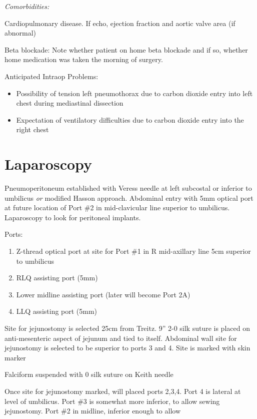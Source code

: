 \documentclass[
  letterpaper,
]{scrbook}
\providecommand{\tightlist}{%
  \setlength{\itemsep}{0pt}\setlength{\parskip}{0pt}}
\begin{document}
\emph{Comorbidities:}

Cardiopulmonary disease. If echo, ejection fraction and aortic valve
area (if abnormal)

Beta blockade: Note whether patient on home beta blockade and if so,
whether home medication was taken the morning of surgery.

Anticipated Intraop Problems:

\begin{itemize}
\tightlist
\item
  Possibility of tension left pneumothorax due to carbon dioxide entry
  into left chest during mediastinal dissection
\item
  Expectation of ventilatory difficulties due to carbon dioxide entry
  into the right chest
\end{itemize}

\section{Laparoscopy}\label{laparoscopy-1}

Pneumoperitoneum established with Veress needle at left subcostal or
inferior to umbilicus \emph{or} modified Hasson approach. Abdominal
entry with 5mm optical port at future location of Port \#2 in
mid-clavicular line superior to umbilicus. Laparoscopy to look for
peritoneal implants.

Ports:

\begin{enumerate}
\def\labelenumi{\arabic{enumi})}
\tightlist
\item
  Z-thread optical port at site for Port \#1 in R mid-axillary line 5cm
  superior to umbilicus
\item
  RLQ assisting port (5mm)
\item
  Lower midline assisting port (later will become Port 2A)
\item
  LLQ assisting port (5mm)
\end{enumerate}

Site for jejunostomy is selected 25cm from Treitz. 9'' 2-0 silk suture
is placed on anti-mesenteric aspect of jejunum and tied to itself.
Abdominal wall site for jejunostomy is selected to be superior to ports
3 and 4. Site is marked with skin marker

Falciform suspended with 0 silk suture on Keith needle

Once site for jejunostomy marked, will placed ports 2,3,4. Port 4 is
lateral at level of umbilicus. Port \#3 is somewhat more inferior, to
allow sewing jejunostomy. Port \#2 in midline, inferior enough to allow
\end{document}
